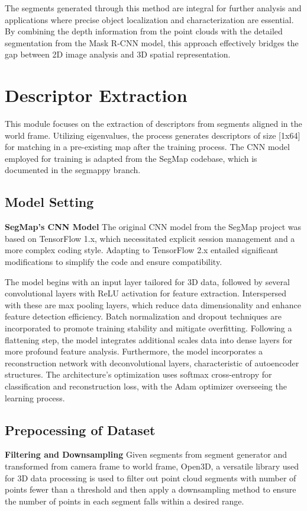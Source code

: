 The segments generated through this method are integral for further analysis and applications where precise object localization and characterization are essential. By combining the depth information from the point clouds with the detailed segmentation from the Mask R-CNN model, this approach effectively bridges the gap between 2D image analysis and 3D spatial representation.

\section{Descriptor Extraction}

This module focuses on the extraction of descriptors from segments aligned in the world frame. Utilizing eigenvalues, the process generates descriptors of size [1x64] for matching in a pre-existing map after the training process. The CNN model employed for training is adapted from the SegMap codebase\cite{segmap,segmap2,segmatch2017}, which is documented in the segmappy branch\cite{segmmappy}.

\subsection{Model Setting}

\textbf{SegMap's CNN Model} The original CNN model from the SegMap project was based on TensorFlow 1.x, which necessitated explicit session management and a more complex coding style. Adapting to TensorFlow 2.x entailed significant modifications to simplify the code and ensure compatibility. 

The model begins with an input layer tailored for 3D data, followed by several convolutional layers with ReLU activation for feature extraction. Interspersed with these are max pooling layers, which reduce data dimensionality and enhance feature detection efficiency. Batch normalization and dropout techniques are incorporated to promote training stability and mitigate overfitting. Following a flattening step, the model integrates additional scales data into dense layers for more profound feature analysis. Furthermore, the model incorporates a reconstruction network with deconvolutional layers, characteristic of autoencoder structures. The architecture's optimization uses softmax cross-entropy for classification and reconstruction loss, with the Adam optimizer overseeing the learning process. 

\subsection{Prepocessing of Dataset}
\textbf{Filtering and Downsampling}
Given segments from segment generator and transformed from camera frame to world frame, Open3D, a versatile library used for 3D data processing is used to filter out point cloud segments with number of points fewer than a threshold and then apply a downsampling method to ensure the number of points in each segment falls within a desired range.

